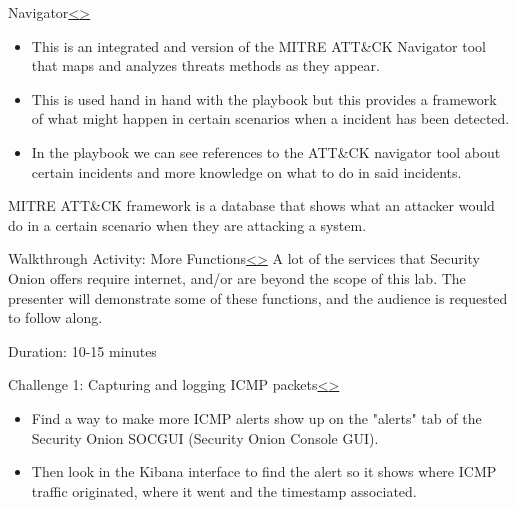\documentclass[12pt]{article}
\newenvironment{instructionblock}{\Large\bgroup}{\egroup}
\newcommand{\bi}{\begin{itemize}}
\newcommand{\ei}{\end{itemize}}
\begin{document}
\pagebreak
\begin{slide}{Navigator}{\hyperref[slide 15]{\textless}\hyperref[slide 17]{\textgreater}}
	\begin{instructionblock}
		\bi
			\item This is an integrated and version of the MITRE ATT&CK Navigator tool that maps and analyzes threats methods as they appear.
			
			\item This is used hand in hand with the playbook but this provides a framework of what might happen in certain scenarios when a incident has been detected.
			
			\item In the playbook we can see references to the ATT&CK navigator tool about certain incidents and more knowledge on what to do in said incidents.
		\ei

	\end{instructionblock}
\end{slide}

\vfill 
MITRE ATT&CK framework is a database that shows what an attacker would do in a certain scenario when they are attacking a system.




\pagebreak
\begin{slide}{Walkthrough Activity: More Functions}{\hyperref[slide 16]{\textless}\hyperref[slide 18]{\textgreater}}
	\begin{instructionblock}
		A lot of the services that Security Onion offers require internet, and/or are beyond the scope of this lab. The presenter will demonstrate some of these functions, and the audience is requested to follow along.
	\end{instructionblock}
\end{slide}
\vfill
Duration: 10-15 minutes


\pagebreak
\begin{slide}{Challenge 1: Capturing and logging ICMP packets}{\hyperref[slide 17]{\textless}\hyperref[slide 19]{\textgreater}}
	\begin{instructionblock}
		\begin{itemize}
			\item Find a way to make more ICMP alerts show up on the "alerts" tab of the Security Onion SOCGUI (Security Onion Console GUI).
            \item Then look in the Kibana interface to find the alert so it shows where ICMP traffic originated, where it went and the timestamp associated.
		\end{itemize}
	\end{instructionblock}
\end{slide}
\end{document}

